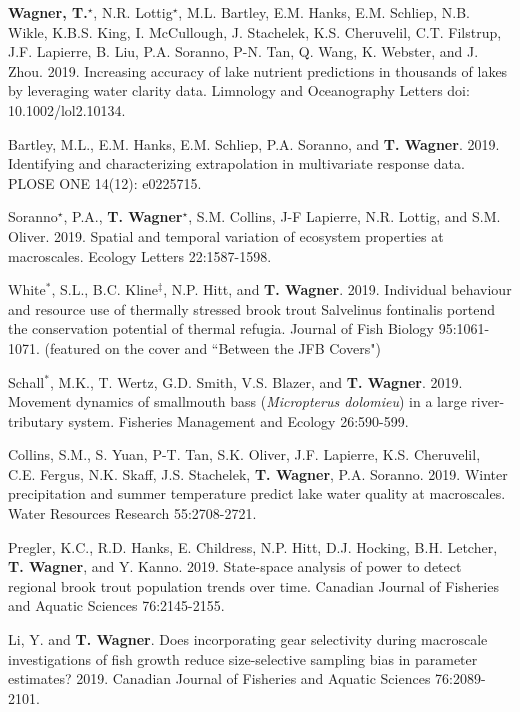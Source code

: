 \documentclass[10pt]{article}
\begin{document}
\begin{flushleft}
\begin{etaremune}[start=91]
\item \textbf{Wagner, T.$^\star$}, N.R. Lottig$^\star$, M.L. Bartley, E.M. Hanks, E.M. Schliep, N.B. Wikle, K.B.S. King, I. McCullough, J. Stachelek, K.S. Cheruvelil, C.T. Filstrup, J.F. Lapierre, B. Liu, P.A. Soranno, P-N. Tan, Q. Wang, K. Webster, and J. Zhou. 2019. Increasing accuracy of lake nutrient predictions in thousands of lakes by leveraging water clarity data. Limnology and Oceanography Letters doi: 10.1002/lol2.10134. 

\item Bartley, M.L., E.M. Hanks, E.M. Schliep, P.A. Soranno, and \textbf{T. Wagner}. 2019. Identifying and characterizing extrapolation in multivariate response data. PLOSE ONE 14(12): e0225715.

\item Soranno$^\star$, P.A., \textbf{T. Wagner$^\star$}, S.M. Collins, J-F Lapierre, N.R. Lottig, and S.M. Oliver. 2019. Spatial and temporal variation of ecosystem properties at macroscales. Ecology Letters 22:1587-1598.

\item White$^*$, S.L., B.C. Kline$^\ddagger$, N.P. Hitt, and\textbf{ T. Wagner}. 2019. Individual behaviour and resource use of thermally stressed brook trout Salvelinus fontinalis portend the conservation potential of thermal refugia. Journal of Fish Biology 95:1061-1071. (featured on the cover and ``Between the JFB Covers")

\item Schall$^*$, M.K., T. Wertz, G.D. Smith, V.S. Blazer, and \textbf{T. Wagner}. 2019. Movement dynamics of smallmouth bass (\textit{Micropterus dolomieu}) in a large river-tributary system. Fisheries Management and Ecology 26:590-599.	

\item Collins, S.M., S. Yuan, P-T. Tan, S.K. Oliver, J.F. Lapierre, K.S. Cheruvelil, C.E. Fergus, N.K. Skaff, J.S. Stachelek, \textbf{T. Wagner}, P.A. Soranno. 2019. Winter precipitation and summer temperature predict lake water quality at macroscales. Water Resources Research 55:2708-2721.
	
\item Pregler, K.C., R.D. Hanks, E. Childress, N.P. Hitt, D.J. Hocking, B.H. Letcher, \textbf{T. Wagner}, and Y. Kanno. 2019. State-space analysis of power to detect regional brook trout population trends over time. Canadian Journal of Fisheries and Aquatic Sciences 76:2145-2155.

\item Li, Y. and \textbf{T. Wagner}. Does incorporating gear selectivity during macroscale investigations of fish growth reduce size-selective sampling bias in parameter estimates? 2019. Canadian Journal of Fisheries and Aquatic Sciences 76:2089-2101.


\end{etaremune}
\end{flushleft}
\end{document}
